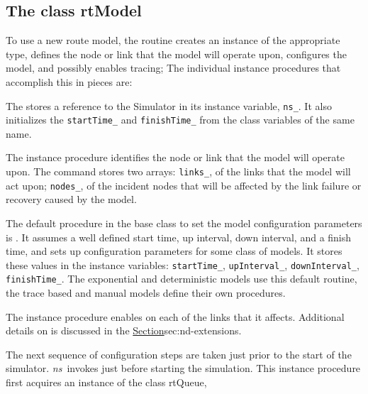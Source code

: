 \subsection{The class rtModel}
\label{sec:rtmodel}

To use a new route model, the routine 
creates an instance of the appropriate type,
defines the node or link that the model will operate upon,
configures the model,
and possibly enables tracing;
The individual instance procedures that accomplish this in pieces are:
\begin{list}{}{}
\item The 
  stores a reference to the Simulator in its instance variable, {\tt ns\_}.
  It also initializes the {\tt startTime\_} and {\tt finishTime\_}
  from the class variables of the same name.
\item The instance procedure 
  identifies the node or link that the model will operate upon.
  The command stores two arrays: {\tt links\_}, of the links that the
  model will act upon; {\tt nodes\_}, of the incident nodes
  that will be affected by the link failure or recovery caused by the model.
\item The default procedure in the base class
   to set the model configuration parameters is
  .
  It assumes a well defined
  start time, up interval, down interval, and a finish time,
  and sets up configuration parameters for some class of models.
  It stores these values in the instance variables:
  {\tt startTime\_}, {\tt upInterval\_}, {\tt downInterval\_},
  {\tt finishTime\_}.
    The exponential and deterministic models use this default routine,
  the trace based and manual models define their own procedures.
\item %
  The instance procedure
  enables  on each of the links that it affects.
  Additional details on  is discussed in the
  \href{section on extensions to the class Link}{Section}{sec:nd-extensions}.
\end{list}
The next sequence of configuration steps are taken just prior to
the start of the simulator.
\emph{ns}\ invokes 
just before starting the simulation.
This instance procedure first acquires an instance of the class rtQueue,
